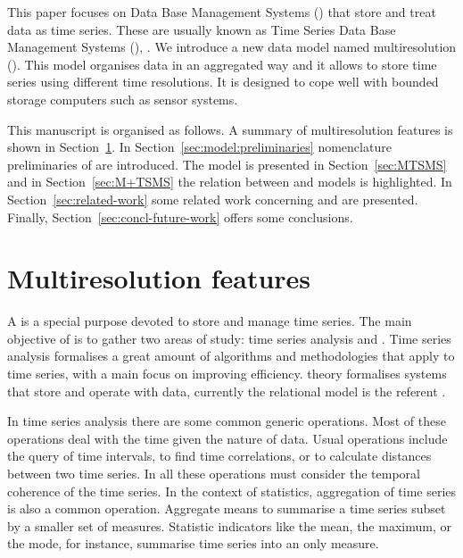
This paper focuses on Data Base Management Systems \linebreak[4]
() that store and treat data as time series. These are
usually known as Time Series Data Base Management Systems
(), \cite{dreyer94,last01}.  We introduce a new data model named
multiresolution  (). This model organises data
in an aggregated way and it allows to store time series using
different time resolutions. It is designed to cope well with bounded
storage computers such as sensor systems.




This manuscript is organised as follows.  A summary of multiresolution
features is shown in Section~\ref{sec:features}. In
Section~\ref{sec:model:preliminaries} nomenclature preliminaries of
 are introduced. The  model is presented in
Section~\ref{sec:MTSMS} and in Section~\ref{sec:M+TSMS} the relation
between  and  models is highlighted.
In Section~\ref{sec:related-work} some related work concerning
 and  are presented. Finally,
Section~\ref{sec:concl-future-work} offers some conclusions.



\section{Multiresolution features}
\label{sec:features}

A  is a special purpose  devoted to store and
manage time series.  The main objective of  is to gather
two areas of study: time series analysis and .  Time series
analysis formalises a great amount of algorithms and methodologies
that apply to time series, with a main focus on improving
efficiency.  theory formalises systems that store and
operate with data, currently the relational model is the referent
\cite{date:introduction}.

In time series analysis there are some common generic operations.
Most of these operations deal with the time given the nature of data.
Usual operations include the query of time intervals, to find time
correlations, or to calculate distances between two time series. In
all these operations  must consider the temporal coherence
of the time series.  In the context of statistics, aggregation of time
series is also a common operation. Aggregate means to summarise a time
series subset by a smaller set of measures. Statistic indicators like
the mean, the maximum, or the mode, for instance, summarise time
series into an only measure.


